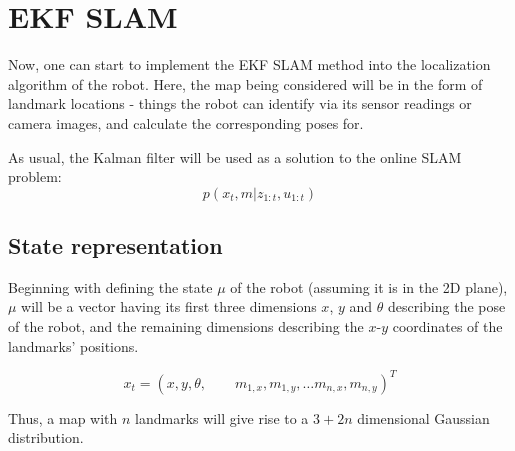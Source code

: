 \documentclass[a4paper]{article}
\begin{document}
\pagebreak


\section{EKF SLAM}

Now, one can start to implement the EKF SLAM method into the localization algorithm of the robot. Here, the map being considered will be in the form of landmark locations - things the robot can identify via its sensor readings or camera images, and calculate the corresponding poses for. 

As usual, the Kalman filter will be used as a solution to the online SLAM problem:
\begin{equation*}
    p(x_t,m|z_{1:t}, u_{1:t})
\end{equation*}

\subsection{State representation}

Beginning with defining the state $\mu$ of the robot (assuming it is in the 2D plane), $\mu$ will be a vector having its first three dimensions $x$, $y$ and $\theta$ describing the pose of the robot, and the remaining dimensions describing the $x$-$y$ coordinates of the landmarks' positions.

\begin{equation*}
    x_t = ( x, y, \theta, \qquad m_{1,x}, m_{1,y}, \ldots m_{n,x}, m_{n,y})^T
\end{equation*}

Thus, a map with $n$ landmarks will give rise to a $3+2n$ dimensional Gaussian distribution.
\end{document}
